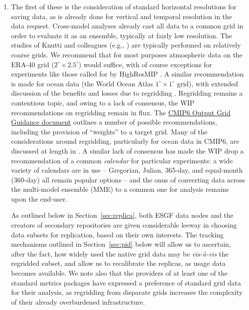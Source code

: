 \documentclass[gmd,manuscript]{copernicus}
\newcommand{\bibref}[1] { \cite{ref:#1}}
\newcommand{\pipref}[1] {\citep{ref:#1}}
\newcommand{\secref}[1] {\mbox{Section  \ref{sec:#1}}}
\begin{document}
\begin{enumerate}
\item The first of these is the consideration of standard horizontal
  resolutions for saving data, as is already done for vertical and
  temporal resolution in the data request. Cross-model analyses
  already cast all data to a common grid in order to evaluate it as an
  ensemble, typically at fairly low resolution. The studies of Knutti
  and colleagues (e.g., \bibref{knuttietal2017}) are typically
  performed on relatively coarse grids. We recommend that for most
  purposes atmospheric data on the ERA-40 grid
  ($2^\circ\times 2.5^\circ$) would suffice, with of course exceptions
  for experiments like those called for by HighResMIP
  \pipref{haarsmaetal2016}. A similar recommendation is made for ocean
  data (the World Ocean Atlas $1^\circ\times 1^\circ$ grid), with
  extended discussion of the benefits and losses due to regridding
  \citep[see][]{ref:griffiesetal2014,ref:griffiesetal2016}.
  Regridding remains a contentious topic, and owing to
  a lack of consensus, the WIP recommendations on regridding remain in
  flux. The \href{https://goo.gl/wVtm5t}{CMIP6 Output Grid Guidance
    document} outlines a number of possible recommendations, including
  the provision of ``weights'' to a target grid. Many of the
  considerations around regridding, particularly for ocean data in
  CMIP6, are discussed at length in \bibref{griffiesetal2016}. A
  similar lack of consensus has made the WIP drop a recommendation of
  a common \emph{calendar} for particular experiments: a wide variety
  of calendars are in use -- Gregorian, Julian, 365-day, and
  equal-month (360-day) all remain popular options -- and the onus of
  converting data across the multi-model ensemble (MME) to a common
  one for analysis remains upon the end-user.

  As outlined below in \secref{replica}, both ESGF data nodes and the
  creators of secondary repositories are given considerable leeway in
  choosing data subsets for replication, based on their own interests.
  The tracking mechanisms outlined in \secref{pid} below will allow us
  to ascertain, after the fact, how widely used the native grid data
  may be \emph{vis-\`a-vis} the regridded subset, and allow us to
  recalibrate the replicas, as usage data becomes available. We note
  also that the providers of at least one of the standard metrics
  packages \citep[ESMValTool,][]{ref:eyringetal2016a} have expressed a
  preference of standard grid data for their analysis, as regridding
  from disparate grids increases the complexity of their already
  overburdened infrastructure.


\end{enumerate}
\end{document}
